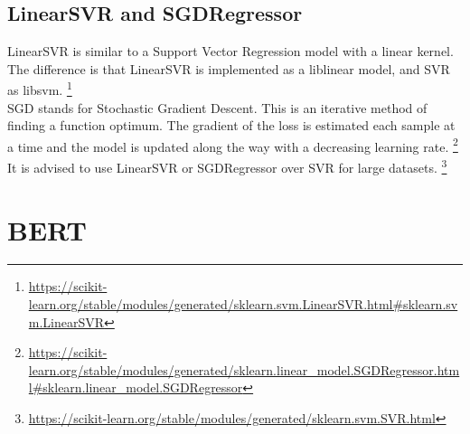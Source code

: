 \documentclass[times, utf8, zavrsni, english]{fer}
\begin{document}
\subsection{LinearSVR and SGDRegressor}
LinearSVR is similar to a Support Vector Regression model with a linear kernel. 
The difference is that LinearSVR is implemented as a liblinear model, and SVR as libsvm. \footnote{\url{https://scikit-learn.org/stable/modules/generated/sklearn.svm.LinearSVR.html#sklearn.svm.LinearSVR}} \\
SGD stands for Stochastic Gradient Descent. This is an iterative method of finding a function optimum. The gradient of the loss is estimated each sample at a time and the model is updated along the way with a decreasing learning rate. \footnote{\url{https://scikit-learn.org/stable/modules/generated/sklearn.linear_model.SGDRegressor.html#sklearn.linear_model.SGDRegressor}} \\
It is advised to use LinearSVR or SGDRegressor over SVR for large datasets. \footnote{\url{https://scikit-learn.org/stable/modules/generated/sklearn.svm.SVR.html}}

\section{BERT}
\end{document}
